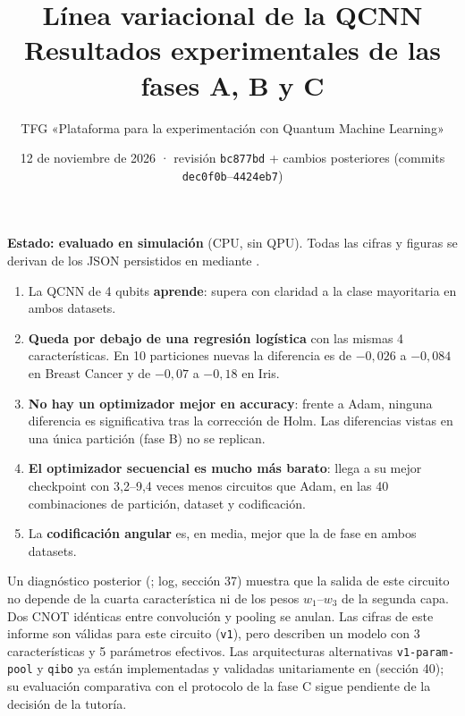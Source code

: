 \documentclass[11pt,a4paper]{article}
\title{\textbf{Línea variacional de la QCNN}\\[2pt]\large Resultados experimentales de las fases A, B y C}
\author{TFG «Plataforma para la experimentación con Quantum Machine Learning»}
\date{12 de noviembre de 2026 · revisión \texttt{bc877bd} + cambios posteriores (commits \texttt{dec0f0b}--\texttt{4424eb7})}
\begin{document}
\maketitle
\thispagestyle{fancy}

\begin{keybox}[Resumen]
\textbf{Estado: evaluado en simulación} (CPU, sin QPU). Todas las cifras y figuras se derivan de los JSON
persistidos en  mediante .
\begin{enumerate}[leftmargin=*]
  \item La QCNN de 4 qubits \textbf{aprende}: supera con claridad a la clase mayoritaria en ambos datasets.
  \item \textbf{Queda por debajo de una regresión logística} con las mismas 4 características. En 10 particiones
        nuevas la diferencia es de $-0{,}026$ a $-0{,}084$ en Breast Cancer y de $-0{,}07$ a $-0{,}18$ en Iris.
  \item \textbf{No hay un optimizador mejor en accuracy}: frente a Adam, ninguna diferencia es significativa tras la
        corrección de Holm. Las diferencias vistas en una única partición (fase B) no se replican.
  \item \textbf{El optimizador secuencial es mucho más barato}: llega a su mejor checkpoint con 3,2--9,4 veces menos
        circuitos que Adam, en las 40 combinaciones de partición, dataset y codificación.
  \item La \textbf{codificación angular} es, en media, mejor que la de fase en ambos datasets.
\end{enumerate}
\end{keybox}

\begin{warnbox}
Un diagnóstico posterior (; log, sección 37) muestra que la salida de este
circuito no depende de la cuarta característica ni de los pesos $w_1$--$w_3$ de la segunda capa. Dos CNOT idénticas
entre convolución y pooling se anulan. Las cifras de este informe son válidas para este circuito (\texttt{v1}), pero
describen un modelo con 3 características y 5 parámetros efectivos. Las arquitecturas alternativas
\texttt{v1-param-pool} y \texttt{qibo} ya están implementadas y validadas unitariamente en
 (sección 40); su evaluación comparativa con el protocolo de la fase C sigue pendiente
de la decisión de la tutoría.
\end{warnbox}
\end{document}
